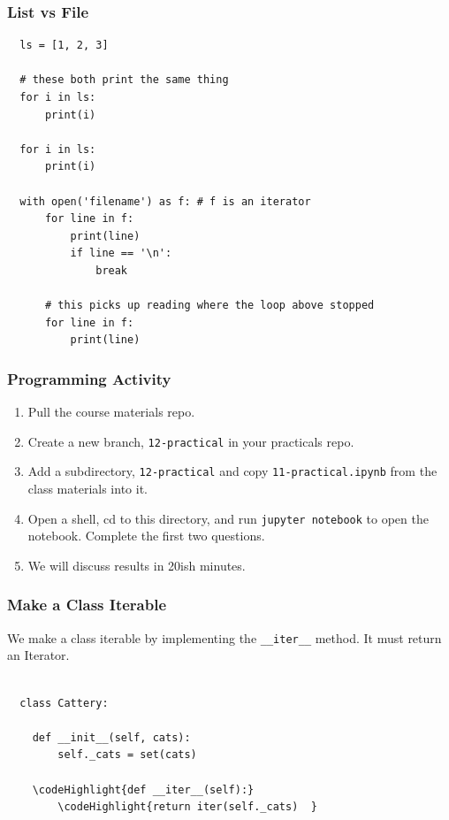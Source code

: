 \documentclass[10pt]{beamer}
\newcommand\codeHighlight[1]{\textcolor[rgb]{1,0,0}{\textbf{#1}}}
\begin{document}
\begin{frame}[fragile]
  \frametitle{List vs File }

  \begin{verbatim}
  ls = [1, 2, 3]
  
  # these both print the same thing
  for i in ls:
      print(i)
      
  for i in ls:
      print(i)  
      
  with open('filename') as f: # f is an iterator
      for line in f:
          print(line)
          if line == '\n':
              break
      
      # this picks up reading where the loop above stopped
      for line in f:
          print(line)              
  \end{verbatim}
 \end{frame} 

\begin{frame}
  \frametitle{Programming Activity}
  
  \begin{enumerate}
    \item Pull the course materials repo.
    \item Create a new branch, \texttt{12-practical} in your practicals repo.
    \item Add a subdirectory,  \texttt{12-practical} and copy \texttt{11-practical.ipynb} from the class materials into it.
    \item Open a shell, cd to this directory, and run \texttt{jupyter notebook} to open the notebook. Complete the first two questions.
    \item We will discuss results in 20ish minutes.
  \end{enumerate}      
\end{frame}

\begin{frame}[fragile]
  \frametitle{Make a Class Iterable}
  We make a class iterable by implementing the \texttt{\_\_iter\_\_} method.
  It must return an Iterator.
  
  \begin{Verbatim}[commandchars=\\\{\}]
  
  class Cattery:
  
    def __init__(self, cats):
        self._cats = set(cats)
        
    \codeHighlight{def __iter__(self):}
        \codeHighlight{return iter(self._cats)  }
           
  \end{Verbatim}
       
\end{frame} 
\end{document}
